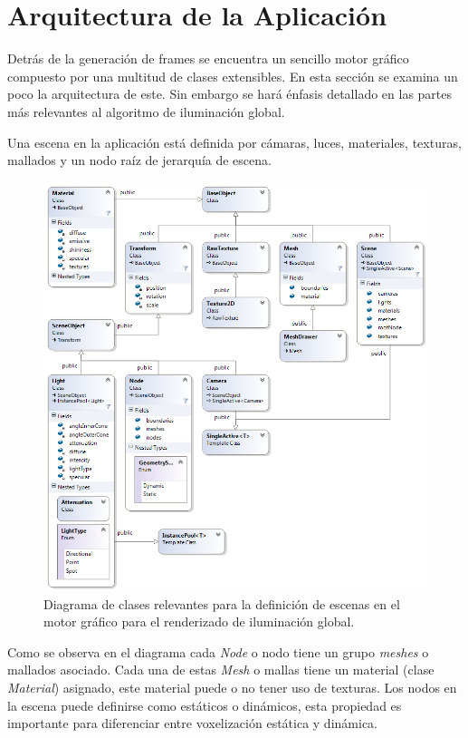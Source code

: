 \section{Arquitectura de la Aplicación} %
\label{sec:arquitectura_de_la_aplicacion}
Detrás de la generación de frames se encuentra un sencillo motor gráfico compuesto por una multitud de clases extensibles. En esta sección se examina un poco la arquitectura de este. Sin embargo se hará énfasis detallado en las partes más relevantes al algoritmo de iluminación global.

Una escena en la aplicación está definida por cámaras, luces, materiales, texturas, mallados y un nodo raíz de jerarquía de escena.

\begin{figure}[H]
	\centering
	\captionsetup{justification=centering}
	\includegraphics[width=\linewidth]{media/ClassDiagram1.png}
	\caption{Diagrama de clases relevantes para la definición de escenas en el motor gráfico para el renderizado de iluminación global.}
\end{figure}

Como se observa en el diagrama cada \emph{Node} o nodo tiene un grupo \emph{meshes} o mallados asociado. Cada una de estas \emph{Mesh} o mallas tiene un material (clase \emph{Material}) asignado, este material puede o no tener uso de texturas. Los nodos en la escena puede definirse como estáticos o dinámicos, esta propiedad es importante para diferenciar entre voxelización estática y dinámica.

